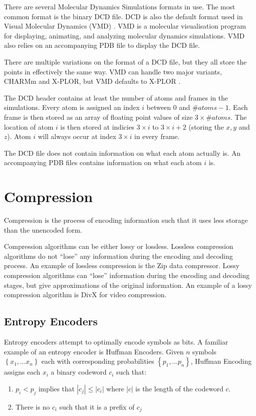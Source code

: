 \documentclass{report}
\begin{document}
There are several Molecular Dynamics Simulations formats in use. The most
common format is the binary DCD file. DCD is also the default format used in
Visual Molecular Dynamics (VMD) \citep{vmd}. VMD is a molecular visualisation
program for displaying, animating, and analyzing molecular dynamics
simulations. VMD also relies on an accompanying PDB file to display the DCD
file.

There are multiple variations on the format of a DCD file, but they all store
the points in effectively the same way. VMD can handle two major variants,
CHARMm and X-PLOR, but VMD defaults to X-PLOR \citep{vmddcdformat}.

The DCD header contains at least the number of atoms and frames in the
simulations. Every atom is assigned an index $i$ between $0$ and $\#atoms -
1$. Each frame is then stored as an array of floating point values of size $3
\times \#atoms$. The location of atom $i$ is then stored at indicies $3 \times
i$ to $3 \times i + 2$ (storing the $x, y$ and $z$). Atom $i$ will always
occur at index $3 \times i$ in every frame.

The DCD file does not contain information on what each atom actually is. An
accompanying PDB files contains information on what each atom $i$ is.


\section{Compression}

Compression is the process of encoding information such that it uses less
storage than the unencoded form.

Compression algorithms can be either lossy or lossless. Lossless compression
algorithms do not ``lose'' any information during the encoding and decoding
process. An example of lossless compression is the Zip data compressor. Lossy
compression algorithms can ``lose'' information during the encoding and
decoding stages, but give approximations of the original information. An
example of a lossy compression algorithm is DivX for video compression.

\subsection{Entropy Encoders}

Entropy encoders attempt to optimally encode symbols as bits. A familiar
example of an entropy encoder is Huffman Encoders. Given $n$ symbols
$\left\{x_1, \dots x_n \right\}$ each with corresponding probabilities
$\left\{p_1, \dots p_n \right\}$, Huffman Encoding assigns each $x_i$ a binary
codeword $c_i$ such that:
\begin{enumerate}
  \item $p_i < p_j$ implies that $|c_j| \le |c_i|$ where $|c|$ is the length
    of the codeword $c$.
  \item There is no $c_i$ such that it is a prefix of $c_j$
\end{enumerate}
\citep{huffman1952method}
\end{document}
